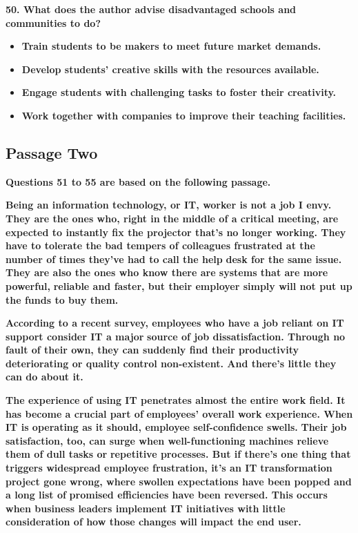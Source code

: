 \documentclass[UTF8,11pt]{ctexart}
\begin{document}
\textbf{50. What does the author advise disadvantaged schools and communities to do?}


\begin{itemize}[leftmargin=2em,itemsep=.2em,topsep=.4em]\item[A.] \textbf{Train students to be makers to meet future market demands.}
\item[B.] \textbf{Develop students' creative skills with the resources available.}
\item[C.] \textbf{Engage students with challenging tasks to foster their creativity.}
\item[D.] \textbf{Work together with companies to improve their teaching facilities.}
\end{itemize}

\subsection*{\textbf{Passage Two}}


\textbf{Questions 51 to 55 are based on the following passage.}


\textbf{Being an information technology, or IT, worker is not a job I envy. They are the ones who, right in} \textbf{the middle of a critical meeting, are expected to instantly fix the projector that's no longer working. They} \textbf{have to tolerate the bad tempers of colleagues frustrated at the number of times they've had to call the help} \textbf{desk for the same issue. They are also the ones who know there are systems that are more powerful,} \textbf{reliable and faster, but their employer simply will not put up the funds to buy them.}


\textbf{According to a recent survey, employees who have a job reliant on IT support consider IT a major} \textbf{source of job dissatisfaction. Through no fault of their own, they can suddenly find their productivity} \textbf{deteriorating or quality control non-existent. And there's little they can do about it.}


\textbf{The experience of using IT penetrates almost the entire work field. It has become a crucial part of} \textbf{employees' overall work experience. When IT is operating as it should, employee self-confidence swells.} \textbf{Their job satisfaction, too, can surge when well-functioning machines relieve them of dull tasks or} \textbf{repetitive processes. But if there's one thing that triggers widespread employee frustration, it's an IT} \textbf{transformation project gone wrong, where swollen expectations have been popped and a long list of} \textbf{promised efficiencies have been reversed. This occurs when business leaders implement IT initiatives with} \textbf{little consideration of how those changes will impact the end user.}
\end{document}
